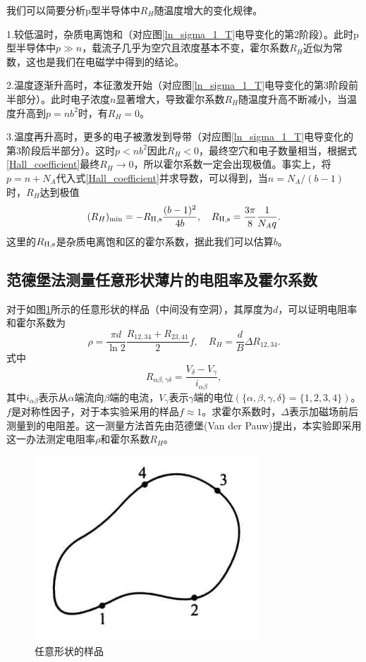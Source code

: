 \documentclass[font=default]{mpltx}
\begin{document}
我们可以简要分析p型半导体中$R_H$随温度增大的变化规律。

1.较低温时，杂质电离饱和（对应图\ref{ln_sigma_1_T}电导变化的第2阶段）。此时p型半导体中$p\gg n$，载流子几乎为空穴且浓度基本不变，霍尔系数$R_H$近似为常数，这也是我们在电磁学中得到的结论。

2.温度逐渐升高时，本征激发开始（对应图\ref{ln_sigma_1_T}电导变化的第3阶段前半部分）。此时电子浓度$n$显著增大，导致霍尔系数$R_H$随温度升高不断减小，当温度升高到$p=nb^2$时，有$R_H=0$。

3.温度再升高时，更多的电子被激发到导带（对应图\ref{ln_sigma_1_T}电导变化的第3阶段后半部分）。这时$p<nb^2$因此$R_H<0$，最终空穴和电子数量相当，根据式\ref{Hall_coefficient}最终$R_H\to 0$，所以霍尔系数一定会出现极值。事实上，将$p=n+N_A$代入式\ref{Hall_coefficient}并求导数，可以得到，当$n=N_A/(b-1)$时，$R_H$达到极值\begin{equation}\label{R_Hmin}
  (R_H)_{\min}=-R_{\rm H,s}\frac{(b-1)^2}{4b},\quad R_{\rm H,s}=\frac{3\pi}{8}\frac{1}{N_Aq}.
\end{equation}这里的$R_{\rm H,s}$是杂质电离饱和区的霍尔系数，据此我们可以估算$b$。

\subsection{范德堡法测量任意形状薄片的电阻率及霍尔系数}
对于如图\ref{arb_sample}所示的任意形状的样品（中间没有空洞），其厚度为$d$，可以证明电阻率和霍尔系数为\cite{Pauw}\begin{equation}
  \rho=\frac{\pi d}{\ln 2}\frac{R_{12,34}+R_{23,41}}{2}f,\quad R_H=\frac{d}{B}\Delta R_{12,34}.
\end{equation}
式中$$R_{\alpha\beta,\gamma\delta}=\frac{V_\delta-V_\gamma}{i_{\alpha\beta}},$$其中$i_{\alpha\beta}$表示从$\alpha$端流向$\beta$端的电流，$V_\gamma$表示$\gamma$端的电位$(\{\alpha,\beta,\gamma,\delta\}=\{1,2,3,4\})$。$f$是对称性因子，对于本实验采用的样品$f\approx 1$。求霍尔系数时，$\Delta$表示加磁场前后测量到的电阻差。这一测量方法首先由范德堡(Van der Pauw)提出，本实验即采用这一办法测定电阻率$\rho$和霍尔系数$R_H$。

\begin{figure}[h]
  \centering
  \includegraphics[width=0.3\linewidth]{fig/arb_sample.png}
  \caption{任意形状的样品}
  \label{arb_sample}
\end{figure}
\end{document}
